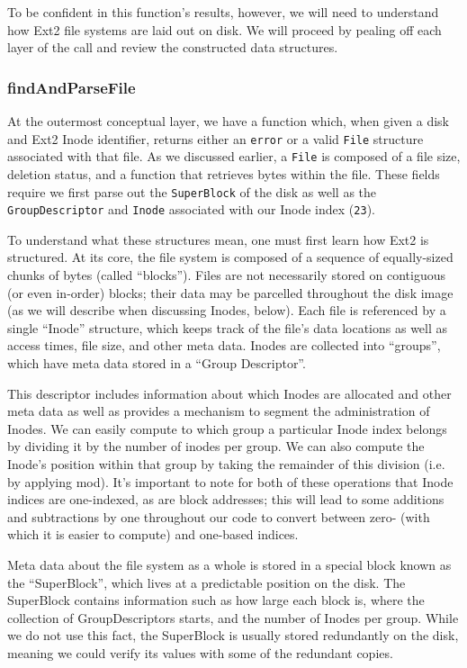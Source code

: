 \documentclass[nocopyrightspace]{sigplanconf}
\begin{document}
To be confident in this function's results, however, we will need to
understand how Ext2 file systems are laid out on disk. We will proceed by
pealing off each layer of the call and review the constructed data structures.

\subsubsection{findAndParseFile}

At the outermost conceptual layer, we have a function which, when given a disk
and Ext2 Inode identifier, returns either an {\tt error} or a valid {\tt File}
structure associated with that file. As we discussed earlier, a {\tt File} is
composed of a file size, deletion status, and a function that retrieves bytes
within the file. These fields require we first parse out the {\tt SuperBlock}
of the disk as well as the {\tt GroupDescriptor} and {\tt Inode} associated
with our Inode index ({\tt 23}).

To understand what these structures mean, one must first learn how Ext2 is
structured. At its core, the file system is composed of a sequence of
equally-sized chunks of bytes (called ``blocks''). Files are not necessarily
stored on contiguous (or even in-order) blocks; their data may be parcelled
throughout the disk image (as we will describe when discussing Inodes, below).
Each file is referenced by a single ``Inode'' structure, which keeps track of
the file's data locations as well as access times, file size, and other meta
data. Inodes are collected into ``groups'', which have meta data stored in a
``Group Descriptor''. 

This descriptor includes information about which Inodes are allocated and
other meta data as well as provides a mechanism to segment the administration
of Inodes. We can easily compute to which group a particular Inode index
belongs by dividing it by the number of inodes per group. We can also compute
the Inode's position within that group by taking the remainder of this
division (i.e. by applying mod). It's important to note for both of these
operations that Inode indices are one-indexed, as are block addresses; this
will lead to some additions and subtractions by one throughout our code to
convert between zero- (with which it is easier to compute) and one-based
indices.

Meta data about the file system as a whole is stored in a special block known
as the ``SuperBlock'', which lives at a predictable position on the disk. The
SuperBlock contains information such as how large each block is, where the
collection of GroupDescriptors starts, and the number of Inodes per group.
While we do not use this fact, the SuperBlock is usually stored redundantly on
the disk, meaning we could verify its values with some of the redundant
copies.
\end{document}
